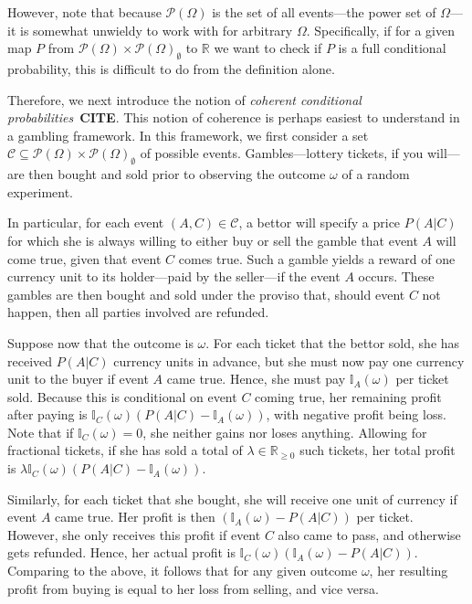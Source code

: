 \documentclass[10pt,a4paper]{paper}
\theoremstyle{definition}
\newcommand{\reals}{\mathbb{R}}
\newcommand{\realsnonneg}{\reals_{\geq 0}}
\newcommand{\paths}{\Omega}
\newcommand{\power}{\mathcal{P}(\paths)}
\newcommand{\nonemptypower}{\power_{\emptyset}}
\newcommand{\ind}[1]{\mathbb{I}_{#1}}
\begin{document}
However, note that because $\power$ is the set of all events---the power set of $\Omega$---it is somewhat unwieldy to work with for arbitrary $\Omega$. Specifically, if for a given map $P$ from $\power\times\nonemptypower$ to $\reals$ we want to check if $P$ is a full conditional probability, this is difficult to do from the definition alone.

Therefore, we next introduce the notion of \emph{coherent conditional probabilities}~{\bf CITE}. %
This notion of coherence is perhaps easiest to understand in a gambling framework. In this framework, we first consider a set $\mathcal{C}\subseteq\power\times\nonemptypower$ of possible events. Gambles---lottery tickets, if you will---are then bought and sold prior to observing the outcome $\omega$ of a random experiment. 

In particular, for each event $(A,C)\in\mathcal{C}$, a bettor will specify a price $P(A\vert C)$ for which she is always willing to either buy or sell the gamble that event $A$ will come true, given that event $C$ comes true. Such a gamble yields a reward of one currency unit to its holder---paid by the seller---if the event $A$ occurs. These gambles are then bought and sold under the proviso that, should event $C$ not happen, then all parties involved are refunded. 

Suppose now that the outcome is $\omega$. For each ticket that the bettor sold, she has received $P(A\vert C)$ currency units in advance, but she must now pay one currency unit to the buyer if event $A$ came true. Hence, she must pay $\ind{A}(\omega)$ per ticket sold. Because this is conditional on event $C$ coming true, her remaining profit after paying is $\ind{C}(\omega)(P(A\vert C) - \ind{A}(\omega))$, with negative profit being loss. Note that if $\ind{C}(\omega)=0$, she neither gains nor loses anything. Allowing for fractional tickets, if she has sold a total of $\lambda\in\realsnonneg$ such tickets, her total profit is $\lambda \ind{C}(\omega)(P(A\vert C) - \ind{A}(\omega))$.

Similarly, for each ticket that she bought, she will receive one unit of currency if event $A$ came true. Her profit is then $(\ind{A}(\omega) - P(A\vert C))$ per ticket. However, she only receives this profit if event $C$ also came to pass, and otherwise gets refunded. Hence, her actual profit is $\ind{C}(\omega)(\ind{A}(\omega) - P(A\vert C))$. Comparing to the above, it follows that for any given outcome $\omega$, her resulting profit from buying is equal to her loss from selling, and vice versa.
\end{document}
